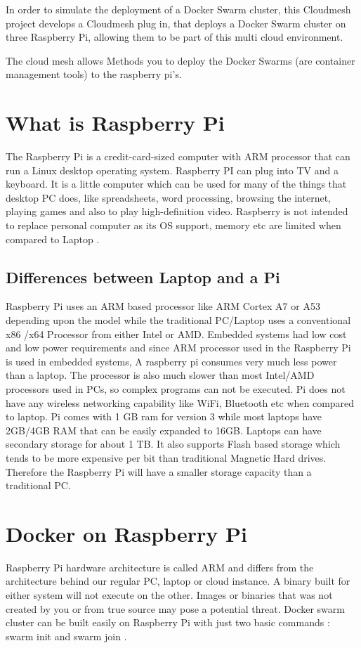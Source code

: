 \documentclass[sigconf]{acmart}
\begin{document}
	In order to simulate the deployment of a Docker Swarm cluster, this Cloudmesh project develops a Cloudmesh plug in, that deploys a Docker Swarm cluster on three Raspberry Pi, allowing them to be part of this multi cloud environment.
	
	The cloud mesh allows Methods you to deploy the Docker Swarms (are container management tools) to the raspberry pi's.
	
	\section{What is Raspberry Pi}
	The Raspberry Pi is a credit-card-sized computer with ARM processor that can run a Linux desktop operating system. Raspberry PI can plug into TV and a keyboard. It is a little computer which can be used for many of the things that desktop PC does, like spreadsheets, word processing, browsing the internet, playing games and also to play high-definition video. Raspberry is not intended to replace personal computer as its OS support, memory etc are limited when compared to Laptop \cite{Rpi}.
	
    \subsection{Differences between Laptop and a Pi}
    Raspberry Pi uses an ARM based processor like ARM Cortex A7 or A53 depending upon the model while the traditional PC/Laptop uses a conventional x86 /x64 Processor from either Intel or AMD. Embedded systems had low cost and low power requirements and since ARM processor used in the Raspberry Pi is used in embedded systems, A raspberry pi consumes very much less power than a laptop. The processor is also much slower than most Intel/AMD processors used in PCs, so complex programs can not be executed. Pi does not have any wireless networking capability like WiFi, Bluetooth etc when compared to laptop. Pi comes with 1 GB ram for version 3 while most laptops have 2GB/4GB RAM that can be easily expanded to 16GB. Laptops can have secondary storage for about 1 TB. It also supports Flash based storage which tends to be more expensive per bit than traditional Magnetic Hard drives. Therefore the Raspberry Pi will have a smaller storage capacity than a traditional PC. 
    
    \section{Docker on Raspberry Pi}
	Raspberry Pi hardware architecture is called ARM and differs from the architecture behind our regular PC, laptop or cloud instance. A binary built for either system will not execute on the other. Images or binaries that was not created by you or from true source may pose a potential threat. Docker swarm cluster can be built easily on Raspberry Pi with just two basic commands : swarm init and swarm join \cite{dockrpi}.
\end{document}
